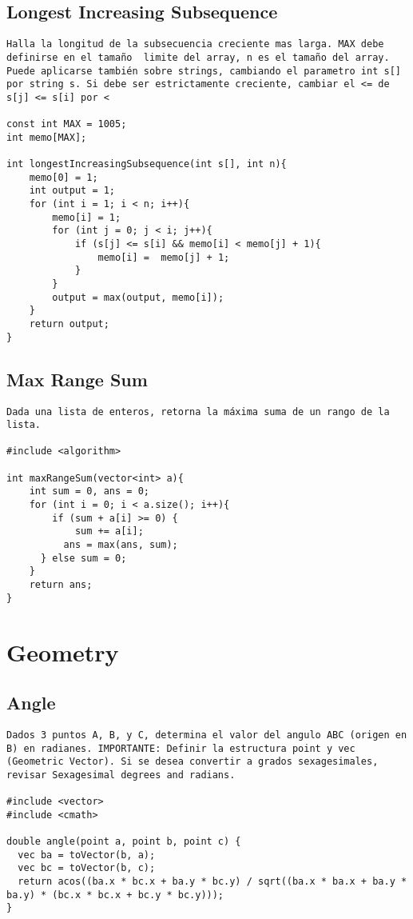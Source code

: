 \documentclass[10pt,letterpaper,twocolumn,twosided]{article}
\begin{document}
\subsection{Longest Increasing Subsequence}
\begin{lstlisting}
Halla la longitud de la subsecuencia creciente mas larga. MAX debe definirse en el tamaño  limite del array, n es el tamaño del array. Puede aplicarse también sobre strings, cambiando el parametro int s[] por string s. Si debe ser estrictamente creciente, cambiar el <= de s[j] <= s[i] por <

const int MAX = 1005;
int memo[MAX];

int longestIncreasingSubsequence(int s[], int n){
	memo[0] = 1;
	int output = 1;
	for (int i = 1; i < n; i++){
		memo[i] = 1;
		for (int j = 0; j < i; j++){
			if (s[j] <= s[i] && memo[i] < memo[j] + 1){
				memo[i] =  memo[j] + 1;
			} 
		}
		output = max(output, memo[i]);
	}
	return output;
}
\end{lstlisting}

\subsection{Max Range Sum}
\begin{lstlisting}
Dada una lista de enteros, retorna la máxima suma de un rango de la lista.

#include <algorithm>

int maxRangeSum(vector<int> a){
	int sum = 0, ans = 0;
	for (int i = 0; i < a.size(); i++){
		if (sum + a[i] >= 0) {  
			sum += a[i];
		  ans = max(ans, sum);          
	  } else sum = 0;
	}
	return ans;
}
\end{lstlisting}

\section{Geometry}

\subsection{Angle}
\begin{lstlisting}
Dados 3 puntos A, B, y C, determina el valor del angulo ABC (origen en B) en radianes. IMPORTANTE: Definir la estructura point y vec (Geometric Vector). Si se desea convertir a grados sexagesimales, revisar Sexagesimal degrees and radians.

#include <vector>
#include <cmath>

double angle(point a, point b, point c) { 
  vec ba = toVector(b, a);
  vec bc = toVector(b, c);
  return acos((ba.x * bc.x + ba.y * bc.y) / sqrt((ba.x * ba.x + ba.y * ba.y) * (bc.x * bc.x + bc.y * bc.y))); 
}
\end{lstlisting}
\end{document}
